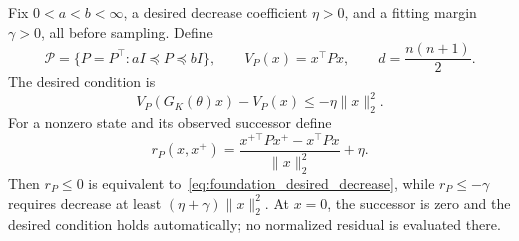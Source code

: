 \begin{definition}
\label{def:foundation_candidates}
Fix $0<a<b<\infty$, a desired decrease coefficient $\eta>0$, and a fitting
margin $\gamma>0$, all before sampling. Define
\begin{equation}
\label{eq:foundation_candidate_class}
 \mathcal P=\{P=P^\top:aI\preceq P\preceq bI\},
 \qquad V_P(x)=x^\top Px,
 \qquad d=\frac{n(n+1)}2.
\end{equation}
The desired condition is
\begin{equation}
\label{eq:foundation_desired_decrease}
 V_P(G_K(\theta)x)-V_P(x)\le-\eta\|x\|_2^2.
\end{equation}
For a nonzero state and its observed successor define
\begin{equation}
\label{eq:foundation_residual}
 r_P(x,x^+)=\frac{x^{+\top}Px^+-x^\top Px}{\|x\|_2^2}+\eta.
\end{equation}
Then $r_P\le0$ is equivalent to~\eqref{eq:foundation_desired_decrease},
while $r_P\le-\gamma$ requires decrease at least
$(\eta+\gamma)\|x\|_2^2$. At $x=0$, the successor is zero and the desired
condition holds automatically; no normalized residual is evaluated there.
\end{definition}

